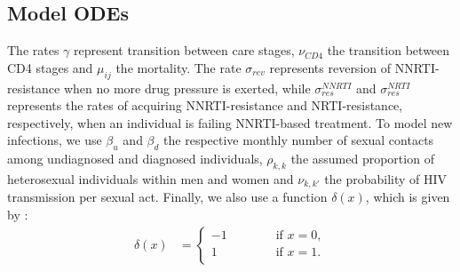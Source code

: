 \documentclass{article}
\begin{document}
\subsection{Model ODEs}
The rates $\gamma$ represent transition between care stages, $\nu_{CD4}$ the transition between CD4 stages and $\mu_{ij}$ the mortality. The rate $\sigma_{rev}$ represents reversion of NNRTI-resistance when no more drug pressure is exerted, while $\sigma^{NNRTI}_{res}$ and $\sigma^{NRTI}_{res}$ represents the rates of acquiring NNRTI-resistance and NRTI-resistance, respectively, when an individual is failing NNRTI-based treatment. To model new infections, we use $\beta_u$ and $\beta_d$ the respective monthly number of sexual contacts among undiagnosed and diagnosed individuals, $\rho_{k,k}$ the assumed proportion of heterosexual individuals within men and women and $\nu_{k,k'}$ the probability of HIV transmission per sexual act. Finally, we also use a function $\delta(x)$, which is given by :
\begin{align}
\delta(x)&= \left\{
      \begin{aligned}
        -1& \qquad & \text{ if } x=0,\\
        1& &\text{ if } x=1.\\
      \end{aligned}
    \right.
\end{align}
\end{document}
